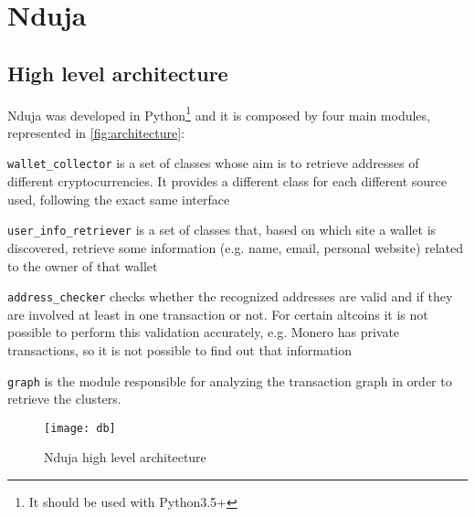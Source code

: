 \newcommand{\walletcollector}{\texttt{wallet\_collector}}
\newcommand{\userinforetriever}{\texttt{user\_info\_retriever}}
\newcommand{\addresschecker}{\texttt{address\_checker}}
\newcommand{\graph}{\texttt{graph}}

\section{Nduja} \label{nduja}
\subsection{High level architecture}
Nduja was developed in Python\footnote{It should be used with Python3.5+} and it
is composed by four main modules, represented in \autoref{fig:architecture}:
\begin{enumerate*}[label=\roman*),itemjoin={,\quad}]
\item \walletcollector{} is a set of classes whose aim is to retrieve
addresses of different cryptocurrencies. It provides a different class for each
different source used, following the exact same interface
\item \userinforetriever{} is a set of classes that, based on which
site a wallet is discovered, retrieve some information (e.g. name, email,
personal website) related to the owner of that wallet
\item \addresschecker{} checks whether the recognized addresses are valid and if
they are involved at least in one transaction or not. For certain
altcoins it is not possible to perform this validation accurately, e.g.
Monero has private transactions, so it is not possible to find out that
information
\item \graph{} is the module responsible for analyzing the transaction graph
in order to retrieve the clusters.
\end{enumerate*}

\begin{figure}
\centering
\texttt{[image: db]}
\caption{Nduja high level architecture}
\label{fig:architecture}
\end{figure}


